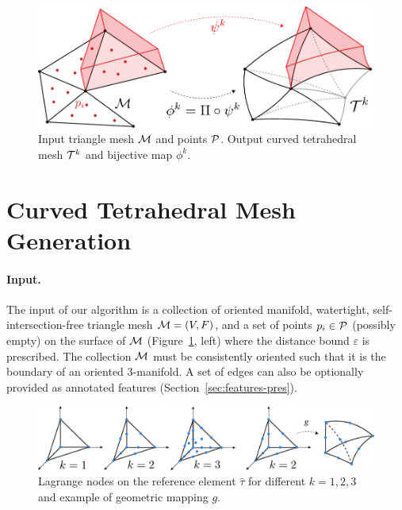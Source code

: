 
\begin{figure}
    \centering
    \includegraphics[width=.8\linewidth]{curve_meshing_in_shell_tex/figs/illustrations/input-output.pdf}
    \caption{Input triangle mesh $\M$ and points $\P$. Output curved tetrahedral mesh $\T^k$ and bijective map $\phi^k$.}
    \label{bichon:fig:input-output}
\end{figure}

\section{Curved Tetrahedral Mesh Generation}\label{sec:curved-pipeline}



\paragraph{Input.}
The input of our algorithm is a collection of oriented manifold, watertight, self-intersection-free triangle mesh $\M=(V,F)$, and a set of points $p_i\in\P$ (possibly empty) on the surface of $\M$ (Figure~\ref{bichon:fig:input-output}, left) where the distance bound $\varepsilon$ is prescribed. The collection $\M$ must be consistently oriented such that it is the boundary of an oriented 3-manifold.
A set of edges can also be optionally provided as annotated features (Section~\ref{sec:features-pres}).

\begin{figure}
    \centering
    \includegraphics[width=\linewidth]{curve_meshing_in_shell_tex/figs/illustrations/high-order.pdf}
    \caption{Lagrange nodes on the reference element $\hat \tau$ for different $k=1,2,3$ and example of geometric mapping $g$.}
    \label{bichon:fig:high-order}
\end{figure}


